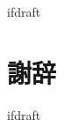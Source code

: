 \expandafter\ifx\csname ifdraft\endcsname\relax
 
\fi

\section*{謝辞}

\expandafter\ifx\csname ifdraft\endcsname\relax
  
\fi
